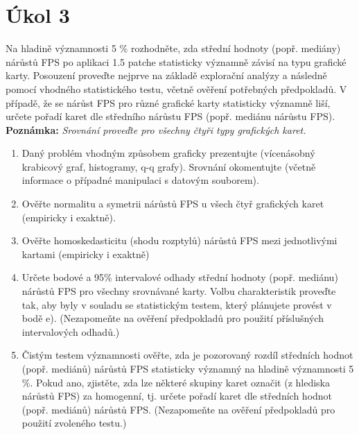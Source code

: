 \section*{Úkol 3}
\label{sec:task-3}

Na hladině významnosti 5 \% rozhodněte, zda střední hodnoty (popř. mediány) nárůstů FPS po aplikaci 1.5 patche statisticky významně závisí na typu grafické karty. Posouzení proveďte nejprve na základě explorační analýzy a následně pomocí vhodného statistického testu, včetně ověření potřebných předpokladů. V případě, že se nárůst FPS pro různé grafické karty statisticky významně liší, určete pořadí karet dle středního nárůstu FPS (popř. mediánu nárůstu FPS). 
\textbf{Poznámka:} \textit{Srovnání proveďte pro všechny čtyři typy grafických karet.}

\begin{enumerate}[label=\alph*)]
    \item Daný problém vhodným způsobem graficky prezentujte (vícenásobný krabicový graf, histogramy, q-q grafy). Srovnání okomentujte (včetně informace o případné manipulaci s datovým souborem).
    
    \newpage
    \item Ověřte normalitu a symetrii nárůstů FPS u všech čtyř grafických karet (empiricky i exaktně).
    
    \newpage
    \item Ověřte homoskedasticitu (shodu rozptylů) nárůstů FPS mezi jednotlivými kartami (empiricky i exaktně)
    
    \newpage
    \item Určete bodové a 95\% intervalové odhady střední hodnoty (popř. mediánu) nárůstů FPS pro všechny srovnávané karty. Volbu charakteristik proveďte tak, aby byly v souladu se statistickým testem, který plánujete provést v bodě e). (Nezapomeňte na ověření předpokladů pro použití příslušných intervalových odhadů.)
    
    \newpage
    \item Čistým testem významnosti ověřte, zda je pozorovaný rozdíl středních hodnot (popř. mediánů) nárůstů FPS statisticky významný na hladině významnosti 5 \%. Pokud ano, zjistěte, zda lze některé skupiny karet označit (z hlediska nárůstů FPS) za homogenní, tj. určete pořadí karet dle středních hodnot (popř. mediánů) nárůstů FPS. (Nezapomeňte na ověření předpokladů pro použití zvoleného testu.)
\end{enumerate}

\endinput